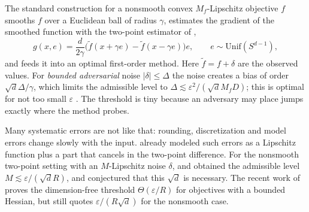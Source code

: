 \documentclass{article} %
\renewcommand{\eps}{\varepsilon}
\newcommand{\unif}{\mathrm{Unif}}
\theoremstyle{plain}
\theoremstyle{definition}
\theoremstyle{remark}
\begin{document}
The standard construction for a nonsmooth convex $M_f$-Lipschitz objective $f$ \citep{gasnikov2022power} smooths $f$ over a Euclidean ball of radius $\gamma$, estimates the gradient of the smoothed function with the two-point estimator of \citet{shamir2017optimal},
\begin{equation}\label{eq:estimator}
  g(x,e)=\frac{d}{2\gamma}\bigl(\tilde f(x+\gamma e)-\tilde f(x-\gamma e)\bigr)e,\qquad e\sim\unif(S^{d-1}),
\end{equation}
and feeds it into an optimal first-order method. Here $\tilde f=f+\delta$ are the observed values. For \emph{bounded adversarial} noise $|\delta|\le\Delta$ the noise creates a bias of order $\sqrt d\Delta/\gamma$, which limits the admissible level to $\Delta\lesssim\eps^2/(\sqrt dM_fD)$; this is optimal for not too small $\eps$ \citep{risteski2016algorithms}. The threshold is tiny because an adversary may place jumps exactly where the method probes.

Many systematic errors are not like that: rounding, discretization and model errors change slowly with the input. \citet{gasnikov2016inexact} already modeled such errors as a Lipschitz function plus a part that cancels in the two-point difference. For the nonsmooth two-point setting with an $M$-Lipschitz noise $\delta$, \citet{dvinskikh2022noisy} and \citet{lobanov2024improved} obtained the admissible level $M\lesssim\eps/(\sqrt d R)$, and \citet[Appendix~B]{dvinskikh2022noisy} conjectured that this $\sqrt d$ is necessary. The recent work of \citet{loginov2026minimax} proves the dimension-free threshold $\Theta(\eps/R)$ for objectives with a bounded Hessian, but still quotes $\eps/(R\sqrt d)$ for the nonsmooth case.
\end{document}
